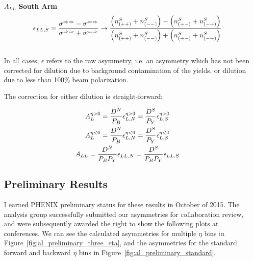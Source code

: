 \noindent\textbf{$A_{LL}$ South Arm}
\begin{equation}
  {\epsilon_{LL,S}}
  = 
  { 
    {\sigma^{\Rightarrow\Rightarrow}-\sigma^{\Leftarrow\Rightarrow}} 
    \over 
    {\sigma^{\Rightarrow\Rightarrow}+\sigma^{\Leftarrow\Rightarrow}} 
  } 
  \to 
  {
    {\left(n_{(++)}^S+n_{(--)}^S\right)-\left(n_{(+-)}^S+n_{(-+)}^S\right)}
    \over
    {\left(n_{(++)}^S+n_{(--)}^S\right)+\left(n_{(+-)}^S+n_{(-+)}^S\right)}
  }
  \label{eq:all_south}
\end{equation}\\

In all cases, $\epsilon$ refers to the raw asymmetry, i.e. an asymmetry which
has not been corrected for dilution due to background contamination of the
yields, or dilution due to less than 100\% beam polarization.

{\noindent}The correction for either dilution is straight-forward:

\begin{gather}
  {A_L^{\eta>0}} = {{D^N}\over{P_B}}{\epsilon_{L,N}^{\eta>0}} = {{D^S}\over{P_Y}}{\epsilon_{L,S}^{\eta>0}} \\
  {A_L^{\eta<0}} = {{D^N}\over{P_B}}{\epsilon_{L,N}^{\eta<0}} = {{D^S}\over{P_Y}}{\epsilon_{L,S}^{\eta<0}} \\
  {A_{LL}}       = {{D^N}\over{P_BP_Y}}{\epsilon_{LL,N}}      = {{D^S}\over{P_BP_Y}}{\epsilon_{LL,S}}       
  \label{eq:dilution_correction}
\end{gather}

\subsection{Preliminary Results}

I earned PHENIX preliminary status for these results in October of 2015.  The
analysis group successfully submitted our asymmetries for collaboration review,
and were subsequently awarded the right to show the following plots at
conferences. We can see the calculated asymmetries for multiple $\eta$ bins in
Figure~\ref{fig:al_preliminary_three_eta}, and the asymmetries for the standard
forward and backward $\eta$ bins in Figure~\ref{fig:al_preliminary_standard}.

